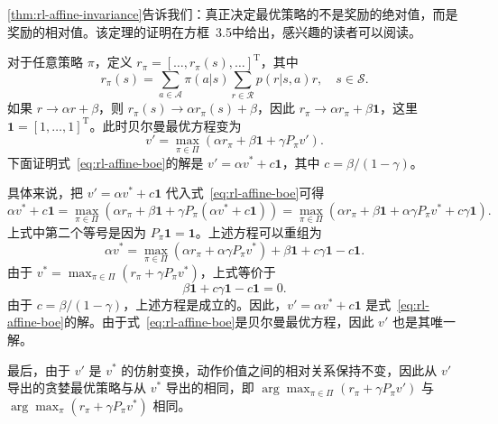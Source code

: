 \cref{thm:rl-affine-invariance}告诉我们：真正决定最优策略的不是奖励的绝对值，而是奖励的相对值。该定理的证明在方框~3.5中给出，感兴趣的读者可以阅读。

\begin{derivation}
\label{box:rl-affine-proof}
对于任意策略 $\pi$，定义 $r_\pi = [\dots, r_\pi(s), \dots]^{\mathrm{T}}$，其中
\begin{equation}
  r_\pi(s) = \sum_{a \in \mathcal{A}} \pi(a|s) \sum_{r \in \mathcal{R}} p(r|s,a) r, \quad s \in \mathcal{S}.
\end{equation}
如果 $r \to \alpha r + \beta$，则 $r_\pi(s) \to \alpha r_\pi(s) + \beta$，因此 $r_\pi \to \alpha r_\pi + \beta \mathbf{1}$，这里 $\mathbf{1} = [1, \ldots, 1]^{\mathrm{T}}$。此时贝尔曼最优方程变为
\begin{equation}
  v' = \max_{\pi \in \varPi} (\alpha r_\pi + \beta \mathbf{1} + \gamma P_\pi v').
\label{eq:rl-affine-boe}
\end{equation}
下面证明式~\eqref{eq:rl-affine-boe}的解是 $v' = \alpha v^* + c \mathbf{1}$，其中 $c = \beta / (1 - \gamma)$。

具体来说，把 $v' = \alpha v^* + c \mathbf{1}$ 代入式~\eqref{eq:rl-affine-boe}可得
\begin{equation}
  \alpha v^* + c \mathbf{1} = \max_{\pi \in \varPi} (\alpha r_\pi + \beta \mathbf{1} + \gamma P_\pi (\alpha v^* + c \mathbf{1})) = \max_{\pi \in \varPi} (\alpha r_\pi + \beta \mathbf{1} + \alpha \gamma P_\pi v^* + c \gamma \mathbf{1}).
\end{equation}
上式中第二个等号是因为 $P_\pi \mathbf{1} = \mathbf{1}$。上述方程可以重组为
\begin{equation}
  \alpha v^* = \max_{\pi \in \varPi} (\alpha r_\pi + \alpha \gamma P_\pi v^*) + \beta \mathbf{1} + c \gamma \mathbf{1} - c \mathbf{1}.
\end{equation}
由于 $v^* = \max_{\pi \in \varPi}(r_\pi + \gamma P_\pi v^*)$，上式等价于
\begin{equation}
  \beta \mathbf{1} + c \gamma \mathbf{1} - c \mathbf{1} = 0.
\end{equation}
由于 $c = \beta / (1 - \gamma)$，上述方程是成立的。因此，$v' = \alpha v^* + c \mathbf{1}$ 是式~\eqref{eq:rl-affine-boe}的解。由于式~\eqref{eq:rl-affine-boe}是贝尔曼最优方程，因此 $v'$ 也是其唯一解。

最后，由于 $v'$ 是 $v^*$ 的仿射变换，动作价值之间的相对关系保持不变，因此从 $v'$ 导出的贪婪最优策略与从 $v^*$ 导出的相同，即 $\arg\max_{\pi \in \varPi}(r_\pi + \gamma P_\pi v')$ 与 $\arg\max_\pi(r_\pi + \gamma P_\pi v^*)$ 相同。
\end{derivation}


